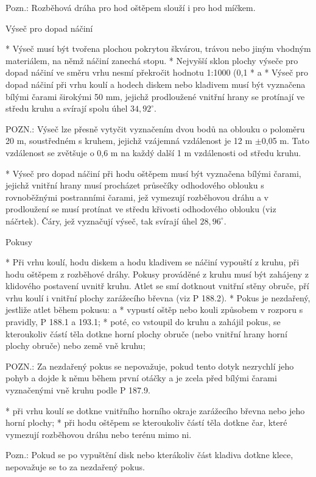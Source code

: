 Pozn.: Rozběhová dráha pro hod oštěpem slouží i pro hod míčkem.

Výseč pro dopad náčiní

* Výseč musí být tvořena plochou pokrytou škvárou, trávou nebo jiným vhodným materiálem, na němž náčiní zanechá stopu.
* Nejvyšší sklon plochy výseče pro dopad náčiní ve směru vrhu nesmí překročit hodnotu 1:1000 (0,1 %
* \begitems \style a
  * Výseč pro dopad náčiní při vrhu koulí a hodech diskem nebo kladivem musí být vyznačena bílými čarami širokými 50 mm, jejichž prodloužené vnitřní hrany se protínají ve středu kruhu a svírají spolu úhel $34,92^\circ$.

  POZN.: Výseč lze přesně vytyčit vyznačením dvou bodů na oblouku o poloměru 20 m, soustředném s kruhem, jejichž vzájemná vzdálenost je 12 m $\pm$0,05 m. Tato vzdálenost se zvětšuje o 0,6 m na každý další 1 m vzdálenosti od středu kruhu.

  * Výseč pro dopad náčiní při hodu oštěpem musí být vyznačena bílými čarami, jejichž vnitřní hrany musí procházet průsečíky odhodového oblouku s rovnoběžnými postranními čarami, jež vymezují rozběhovou dráhu a v prodloužení se musí protínat ve středu křivosti odhodového oblouku (viz náčrtek). Čáry, jež vyznačují výseč, tak svírají úhel $28,96^\circ$.
  \enditems

Pokusy

* Při vrhu koulí, hodu diskem a hodu kladivem se náčiní vypouští z kruhu, při hodu oštěpem z rozběhové dráhy. Pokusy prováděné z kruhu musí být zahájeny z klidového postavení uvnitř kruhu. Atlet se smí dotknout vnitřní stěny obruče, pří vrhu koulí i vnitřní plochy zarážecího břevna (viz P 188.2).
* Pokus je nezdařený, jestliže atlet během pokusu:
  \begitems \style a
  * vypustí oštěp nebo kouli způsobem v rozporu s pravidly, P 188.1 a 193.1;
  * poté, co vstoupil do kruhu a zahájil pokus, se kteroukoliv částí těla dotkne horní plochy obruče (nebo vnitřní hrany horní plochy obruče) nebo země vně kruhu;

  POZN.: Za nezdařený pokus se nepovažuje, pokud tento dotyk nezrychlí jeho pohyb a dojde k němu během první otáčky a je zcela před bílými čarami vyznačenými vně kruhu podle P 187.9.

  * při vrhu koulí se dotkne vnitřního horního okraje zarážecího břevna nebo jeho horní plochy;
  * při hodu oštěpem se kteroukoliv částí těla dotkne čar, které vymezují rozběhovou dráhu nebo terénu mimo ni.
  \enditems

Pozn.: Pokud se po vypuštění disk nebo kterákoliv část kladiva dotkne klece, nepovažuje se to za nezdařený pokus.

